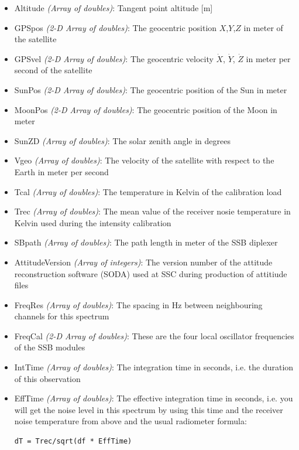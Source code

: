 \begin{itemize}
  \item Altitude \emph{(Array of doubles)}: Tangent point altitude [m]
  \item GPSpos \emph{(2-D Array of doubles)}: The geocentric position $X$,$Y$,$Z$ in meter of the satellite
  \item GPSvel \emph{(2-D Array of doubles)}: The geocentric velocity $\dot X$, $\dot Y$, $\dot Z$ in meter per 
                         second of the satellite
  \item SunPos \emph{(2-D Array of doubles)}: The geocentric position of the Sun in meter
  \item MoonPos \emph{(2-D Array of doubles)}: The geocentric position of the Moon in meter
  \item SunZD \emph{(Array of doubles)}: The solar zenith angle in degrees
  \item Vgeo \emph{(Array of doubles)}: The velocity of the satellite with respect to the Earth in meter per second
  \item Tcal \emph{(Array of doubles)}: The temperature in Kelvin of the calibration load
  \item Trec \emph{(Array of doubles)}: The mean value of the receiver nosie temperature 
                       in Kelvin used during the intensity calibration
  \item SBpath \emph{(Array of doubles)}: The path length in meter of the SSB diplexer
  \item AttitudeVersion \emph{(Array of integers)}: The version number of the attitude reconstruction software (SODA) 
                         used at SSC during production of attitiude files
  \item FreqRes \emph{(Array of doubles)}: The spacing in Hz between neighbouring channels for this spectrum
  \item FreqCal \emph{(2-D Array of doubles)}:  These are the four local oscillator frequencies of the SSB modules
  \item IntTime \emph{(Array of doubles)}: The integration time in seconds, i.e. the duration of this observation
  \item EffTime \emph{(Array of doubles)}: The effective integration time in seconds, i.e. you will get the
                         noise level in this spectrum by using this time and the receiver noise 
                         temperature from above and the usual radiometer formula:
                        \begin{verbatim}dT = Trec/sqrt(df * EffTime)\end{verbatim}

\end{itemize}

